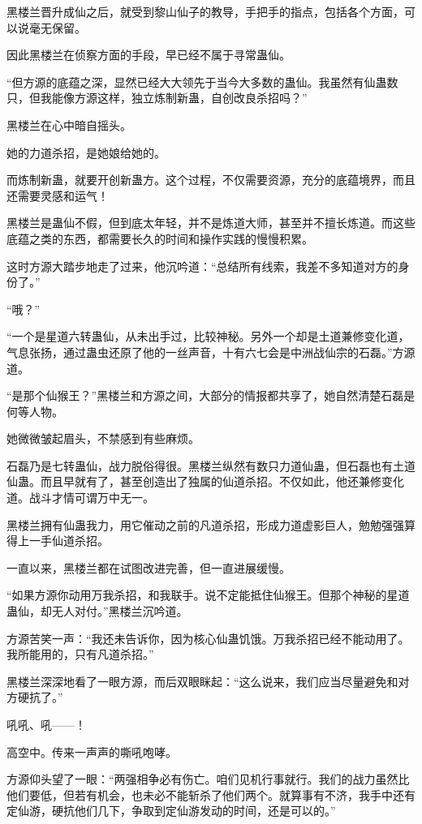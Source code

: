 
\begin{this_body}

黑楼兰晋升成仙之后，就受到黎山仙子的教导，手把手的指点，包括各个方面，可以说毫无保留。

因此黑楼兰在侦察方面的手段，早已经不属于寻常蛊仙。

“但方源的底蕴之深，显然已经大大领先于当今大多数的蛊仙。我虽然有仙蛊数只，但我能像方源这样，独立炼制新蛊，自创改良杀招吗？”

黑楼兰在心中暗自摇头。

她的力道杀招，是她娘给她的。

而炼制新蛊，就要开创新蛊方。这个过程，不仅需要资源，充分的底蕴境界，而且还需要灵感和运气！

黑楼兰是蛊仙不假，但到底太年轻，并不是炼道大师，甚至并不擅长炼道。而这些底蕴之类的东西，都需要长久的时间和操作实践的慢慢积累。

这时方源大踏步地走了过来，他沉吟道：“总结所有线索，我差不多知道对方的身份了。”

“哦？”

“一个是星道六转蛊仙，从未出手过，比较神秘。另外一个却是土道兼修变化道，气息张扬，通过蛊虫还原了他的一丝声音，十有六七会是中洲战仙宗的石磊。”方源道。

“是那个仙猴王？”黑楼兰和方源之间，大部分的情报都共享了，她自然清楚石磊是何等人物。

她微微皱起眉头，不禁感到有些麻烦。

石磊乃是七转蛊仙，战力脱俗得很。黑楼兰纵然有数只力道仙蛊，但石磊也有土道仙蛊。而且早就有了，甚至创造出了独属的仙道杀招。不仅如此，他还兼修变化道。战斗才情可谓万中无一。

黑楼兰拥有仙蛊我力，用它催动之前的凡道杀招，形成力道虚影巨人，勉勉强强算得上一手仙道杀招。

一直以来，黑楼兰都在试图改进完善，但一直进展缓慢。

“如果方源你动用万我杀招，和我联手。说不定能抵住仙猴王。但那个神秘的星道蛊仙，却无人对付。”黑楼兰沉吟道。

方源苦笑一声：“我还未告诉你，因为核心仙蛊饥饿。万我杀招已经不能动用了。我所能用的，只有凡道杀招。”

黑楼兰深深地看了一眼方源，而后双眼眯起：“这么说来，我们应当尽量避免和对方硬抗了。”

吼吼、吼——！

高空中。传来一声声的嘶吼咆哮。

方源仰头望了一眼：“两强相争必有伤亡。咱们见机行事就行。我们的战力虽然比他们要低，但若有机会，也未必不能斩杀了他们两个。就算事有不济，我手中还有定仙游，硬抗他们几下，争取到定仙游发动的时间，还是可以的。”


\end{this_body}
